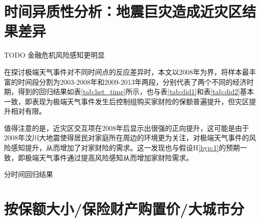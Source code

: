 \section{时间异质性分析：地震巨灾造成近灾区结果差异}
TODO
金融危机风险感知更明显

在探讨极端天气事件对不同时间点的反应差异时，本文以2008年为界，将样本最丰富的时间段分割为2003-2008年和2009-2013年两段，分别代表了两个不同的经济时期，得到的回归结果如表\ref{tab:het_time}所示，也与表\ref{tab:did1}和表\ref{tab:did2}基本一致，即表现为极端天气事件发生后控制组购买家财险的保额普遍提升，但灾区提升相对有限。

值得注意的是，近灾区交互项在2008年后显示出很强的正向提升，这可能是由于2008年汶川大地震使得居民对家庭所在周边的环境更为关注，对极端天气事件的风险感知提升，从而增加了对家财险的需求。这一发现也与假设H\ref{hyp:1}的预期一致，即极端天气事件通过提高风险感知从而增加家财险需求。
\begin{table}[htbp]
    \centering
    \caption{分时间回归结果}\label{tab:het_time}
    
\end{table}

\section{按保额大小/保险财产购置价/大城市分}
